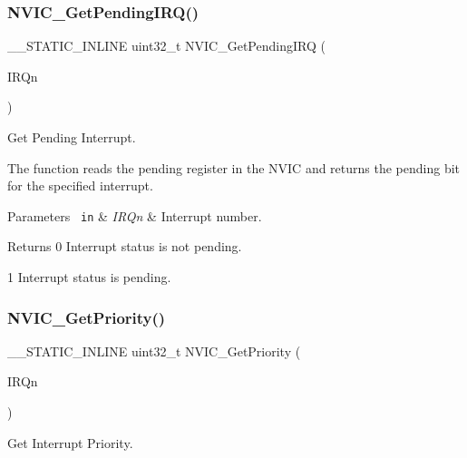 \subsubsection{\texorpdfstring{NVIC\_GetPendingIRQ()}{NVIC\_GetPendingIRQ()}}
{\footnotesize\ttfamily \+\_\+\+\_\+\+S\+T\+A\+T\+I\+C\+\_\+\+I\+N\+L\+I\+NE uint32\+\_\+t N\+V\+I\+C\+\_\+\+Get\+Pending\+I\+RQ (\begin{DoxyParamCaption}\item[{\mbox{\hyperlink{group___configuration__section__for___c_m_s_i_s_gac3af4a32370fb28c4ade8bf2add80251}{I\+R\+Qn\+\_\+\+Type}}}]{I\+R\+Qn }\end{DoxyParamCaption})}



Get Pending Interrupt. 

The function reads the pending register in the N\+V\+IC and returns the pending bit for the specified interrupt.


\begin{DoxyParams}[1]{Parameters}
\mbox{\texttt{ in}}  & {\em I\+R\+Qn} & Interrupt number.\\
\hline
\end{DoxyParams}
\begin{DoxyReturn}{Returns}
0 Interrupt status is not pending. 

1 Interrupt status is pending. 
\end{DoxyReturn}
\mbox{\label{group___c_m_s_i_s___core___n_v_i_c_functions_ga1cbaf8e6abd4aa4885828e7f24fcfeb4}} 
\subsubsection{\texorpdfstring{NVIC\_GetPriority()}{NVIC\_GetPriority()}}
{\footnotesize\ttfamily \+\_\+\+\_\+\+S\+T\+A\+T\+I\+C\+\_\+\+I\+N\+L\+I\+NE uint32\+\_\+t N\+V\+I\+C\+\_\+\+Get\+Priority (\begin{DoxyParamCaption}\item[{\mbox{\hyperlink{group___configuration__section__for___c_m_s_i_s_gac3af4a32370fb28c4ade8bf2add80251}{I\+R\+Qn\+\_\+\+Type}}}]{I\+R\+Qn }\end{DoxyParamCaption})}



Get Interrupt Priority. 

